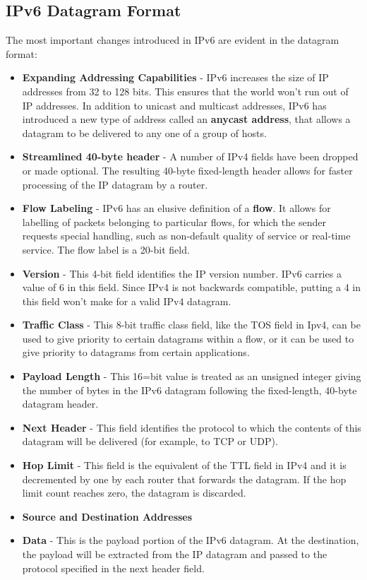 \subsection{IPv6 Datagram Format}
The most important changes introduced in IPv6 are evident in the datagram format:
\begin{itemize}
\item \textbf{Expanding Addressing Capabilities} - IPv6 increases the size of IP addresses from 32 to 128 bits. This ensures that the world won't run out of IP addresses. In addition to unicast and multicast addresses, IPv6 has introduced a new type of address called an \textbf{anycast address}, that allows a datagram to be delivered to any one of a group of hosts.
\item \textbf{Streamlined 40-byte header} - A number of IPv4 fields have been dropped or made optional. The resulting 40-byte fixed-length header allows for faster processing of the IP datagram by a router.
\item \textbf{Flow Labeling} - IPv6 has an elusive definition of a \textbf{flow}. It allows for labelling of packets belonging to particular flows, for which the sender requests special handling, such as non-default quality of service or real-time service. The flow label is a 20-bit field.
\item \textbf{Version} - This 4-bit field identifies the IP version number. IPv6 carries a value of 6 in this field. Since IPv4 is not backwards compatible, putting a 4 in this field won't make for a valid IPv4 datagram.
\item \textbf{Traffic Class} - This 8-bit traffic class field, like the TOS field in Ipv4, can be used to give priority to certain datagrams within a flow, or it can be used to give priority to datagrams from certain applications.
\item \textbf{Payload Length} - This 16=bit value is treated as an unsigned integer giving the number of bytes in the IPv6 datagram following the fixed-length, 40-byte datagram header.
\item \textbf{Next Header} - This field identifies the protocol to which the contents of this datagram will be delivered (for example, to TCP or UDP).
\item \textbf{Hop Limit} - This field is the equivalent of the TTL field in IPv4 and it is decremented by one by each router that forwards the datagram. If the hop limit count reaches zero, the datagram is discarded.
\item \textbf{Source and Destination Addresses}
\item \textbf{Data} - This is the payload portion of the IPv6 datagram. At the destination, the payload will be extracted from the IP datagram and passed to the protocol specified in the next header field.
\end{itemize}
